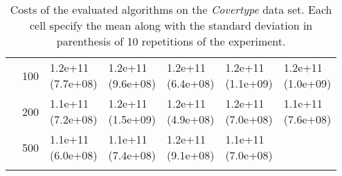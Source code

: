 \begin{longtable}{lllllll}
   & 100 &  \parbox[t]{17mm}{1.2e+11\\\small(7.7e+08)} &  \parbox[t]{17mm}{1.2e+11\\\small(9.6e+08)} &  \parbox[t]{17mm}{1.2e+11\\\small(6.4e+08)} &  \parbox[t]{17mm}{1.2e+11\\\small(1.1e+09)} &  \parbox[t]{17mm}{1.2e+11\\\small(1.0e+09)} \\
   & 200 &  \parbox[t]{17mm}{1.1e+11\\\small(7.2e+08)} &  \parbox[t]{17mm}{1.2e+11\\\small(1.5e+09)} &  \parbox[t]{17mm}{1.2e+11\\\small(4.9e+08)} &  \parbox[t]{17mm}{1.2e+11\\\small(7.0e+08)} &  \parbox[t]{17mm}{1.1e+11\\\small(7.6e+08)} \\
   & 500 &  \parbox[t]{17mm}{1.1e+11\\\small(6.0e+08)} &  \parbox[t]{17mm}{1.1e+11\\\small(7.4e+08)} &  \parbox[t]{17mm}{1.2e+11\\\small(9.1e+08)} &  \parbox[t]{17mm}{1.1e+11\\\small(7.0e+08)} &                 \\
\bottomrule
\caption{Costs of the evaluated algorithms on the \textit{Covertype} data set. Each cell specify the mean along with the standard deviation in parenthesis of 10 repetitions of the experiment.}
\label{tab:real-cost-mean-std-covertype}
\end{longtable}

